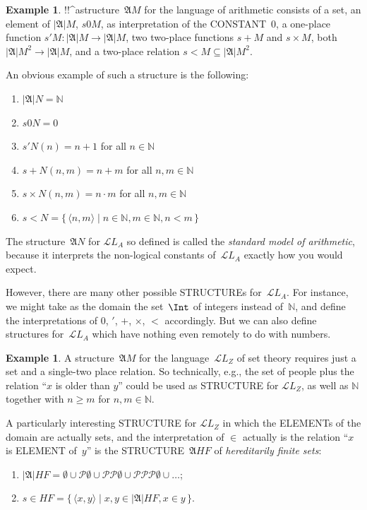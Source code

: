 \documentclass[10pt,a4paper]{article}
\newcommand*{\olup}[1]{\MakeUppercase{#1}}
\theoremstyle{plain}
\theoremstyle{definition}
\newtheorem{ex}[thm]{Example}
\theoremstyle{remark}
\providecommand{\Obj}{}
\providecommand{\Struct}{\ensuremath{\mathfrak{A}}}
\providecommand{\Domain}{\ensuremath{|\mathfrak{A}|}}
\providecommand{\Assign}{\ensuremath{s}}
\providecommand{\Lang}{\ensuremath{\mathcal{L}}}
\providecommand{\tuple}[1]{\langle #1 \rangle}
\providecommand{\Nat}{\ensuremath{\mathbb{N}}}
\providecommand{\Pow}{\mathcal{P}}
\providecommand{\Setabs}[2]{\{\, #1 \mid #2 \,\}}
\begin{document}
\begin{ex}
!!^a{structure}~$\Struct M$ for the language of arithmetic consists of a
  set, an element of $\Domain M$, $\Assign{\Obj 0}{M}$, as
  interpretation of the \olup{constant}~$\Obj 0$, a one-place function
  $\Assign{\Obj \prime}{M} \colon \Domain{M} \to \Domain M$, two
  two-place functions $\Assign{\Obj +}{M}$ and $\Assign{\Obj
    \times}{M}$, both $\Domain M^2 \to \Domain M$, and a two-place
  relation $\Assign{\Obj <}{M} \subseteq \Domain{M}^2$.

An obvious example of such a structure is the following:
\begin{enumerate}
\item $\Domain N = \Nat$
\item $\Assign{\Obj 0}{N} = 0$
\item $\Assign{\Obj \prime}{N}(n) = n + 1$ for all $n \in \Nat$
\item $\Assign{\Obj +}{N}(n, m) = n + m$ for all $n, m \in \Nat$
\item $\Assign{\Obj \times}{N}(n, m) = n\cdot m$ for all $n, m \in \Nat$
\item $\Assign{\Obj <}{N} = \Setabs{\tuple{n, m}}{n \in \Nat, m \in
  \Nat, n < m}$
\end{enumerate}
The structure~$\Struct N$ for $\Lang L_A$ so defined is called the
\emph{standard model of arithmetic}, because it interprets the
non-logical constants of~$\Lang L_A$ exactly how you would expect.

However, there are many other possible \olup{structure}s for~$\Lang
L_A$. For instance, we might take as the domain the set~$\Int$ of
integers instead of~$\Nat$, and define the interpretations of $\Obj
0$, $\Obj \prime$, $\Obj +$, $\Obj \times$, $\Obj <$ accordingly.  But
we can also define structures for~$\Lang L_A$ which have nothing even
remotely to do with numbers.
\end{ex}

\begin{ex}
A structure~$\Struct M$ for the language~$\Lang L_Z$ of set theory requires
just a set and a single-two place relation. So technically, e.g., the
set of people plus the relation ``$x$ is older than $y$'' could be
used as \olup{structure} for $\Lang L_Z$, as well as $\Nat$ together
with $n \ge m$ for $n, m \in \Nat$.

A particularly interesting \olup{structure} for $\Lang L_Z$ in which the
\olup{element}s of the domain are actually sets, and the interpretation
of $\Obj \in$ actually is the relation ``$x$ is \olup{element} of~$y$''
is the \olup{structure}~$\Struct{{HF}}$ of \emph{hereditarily finite sets}:
\begin{enumerate}
\item $\Domain{{{HF}}} = \emptyset \cup \Pow{\emptyset} \cup
  \Pow{\Pow{\emptyset}} \cup \Pow{\Pow{\Pow{\emptyset}}} \cup \dots$;
\item $\Assign{\Obj \in}{{{HF}}} = \Setabs{\tuple{x, y}}{x, y \in
  \Domain{{{HF}}}, x \in y}$.
\end{enumerate}
\end{ex}
\end{document}
